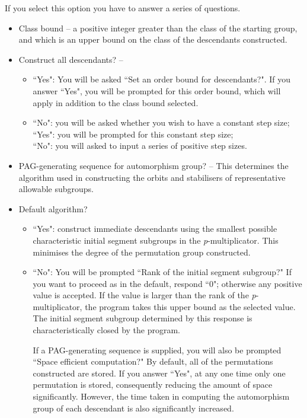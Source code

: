 If you select this option you have to answer a series of questions.
\begin{itemize}
\item Class bound -- a positive integer greater than the class 
	   of the starting group, and which is an upper bound
	   on the class of the descendants constructed. 

\item Construct all descendants? -- 

\begin{itemize}
\item ``Yes":  You will be asked  ``Set an order bound for descendants?". 
If you answer ``Yes", you will be prompted for this order bound, which  
      will apply in addition to the class bound selected.

\item ``No": you will be asked whether you wish to have a constant step size; \\
      \hspace*{1cm}``Yes": you will be prompted for this constant step size; \\
      \hspace*{1cm} ``No": you will asked to input a series of positive
      step sizes.
\end{itemize}

\item PAG-generating sequence for automorphism group? -- 
This determines the algorithm used in constructing the orbits
and stabilisers of representative allowable subgroups.

\item Default algorithm?  

\begin{itemize}
\item ``Yes":  construct immediate descendants using the smallest possible 
 characteristic initial segment subgroups in the {\it p}-multiplicator.
This minimises the degree of the permutation group constructed. 

 \item ``No": You will be prompted ``Rank of the initial segment 
 subgroup?" If you want to proceed as in the default, respond ``0"; 
 otherwise any positive value is accepted. If the value is 
 larger than the rank of the {\it p}-multiplicator, the program
 takes this upper bound as the selected value. The initial segment 
 subgroup determined by this response is characteristically  
 closed by the program.

If a PAG-generating sequence is supplied, 
you will also be prompted ``Space efficient computation?"
By default, all of the permutations constructed are stored.
If you answer ``Yes", at any one time only one permutation is 
stored, consequently reducing the amount of space significantly.
However, the time taken in computing the automorphism group
of each descendant is also significantly increased.


\end{itemize}
\end{itemize}
